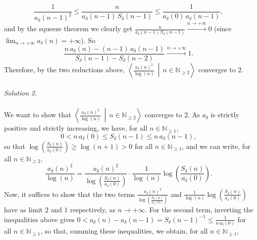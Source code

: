 \begin{solution}
    \[
        \frac{1}{a_\delta\left(n-1\right)^2} \leq \frac{n}{a_\delta\left(n-1\right)\,S_\delta\left(n-1\right)} \leq \frac{1}{a_\delta\left(0\right)\,a_\delta\left(n-1\right)},
    \]
    and by the squeeze theorem we clearly get \( \frac{n}{a_\delta\left(n-1\right)\,S_\delta\left(n-1\right)} \overset{n \to +\infty}{\longrightarrow} 0 \) (since \( \lim_{n \to +\infty} a_\delta\left(n\right) = +\infty \)). So
    \[
        \frac{n\,a_\delta\left(n\right)-\left(n-1\right)\,a_\delta\left(n-1\right)}{S_\delta\left(n-1\right)-S_\delta\left(n-2\right)} \overset{n \to +\infty}{\longrightarrow} 1.
    \]
    Therefore, by the two reductions above, \( \left\langle \frac{a_\delta\left(n\right)^2}{\log\left(n\right)} \,\middle|\, n \in \mathbb{N}_{\geq 2} \right\rangle \) converges to \( 2 \).
    \\\\
    \textit{Solution 2.}
    \\\\
    We want to show that \( \left\langle \frac{a_\delta\left(n\right)^2}{\log\left(n\right)} \,\middle|\, n \in \mathbb{N}_{\geq 2} \right\rangle \) converges to \( 2 \). As \( a_\delta \) is strictly positive and strictly increasing, we have, for all \( n \in \mathbb{N}_{\geq 1} \),
    \[
        0 < n\,a_\delta\left(0\right) \leq S_\delta\left(n-1\right) \leq n\,a_\delta\left(n-1\right),
    \]
    so that \( \log\left(\frac{S_\delta\left(n\right)}{a_\delta\left(0\right)}\right) \geq \log\left(n+1\right) > 0 \) for all \( n \in \mathbb{N}_{\geq 1} \), and we can write, for all \( n \in \mathbb{N}_{\geq 2} \),
    \[
        \frac{a_\delta\left(n\right)^2}{\log\left(n\right)} = \frac{a_\delta\left(n\right)^2}{\log\left(\frac{S_\delta\left(n\right)}{a_\delta\left(0\right)}\right)} \cdot \frac{1}{\log\left(n\right)}\log\left(\frac{S_\delta\left(n\right)}{a_\delta\left(0\right)}\right).
    \]
    Now, it suffices to show that the two terms \( \frac{a_\delta\left(n\right)^2}{\log\left(\frac{S_\delta\left(n\right)}{a_\delta\left(0\right)}\right)} \) and \( \frac{1}{\log\left(n\right)}\log\left(\frac{S_\delta\left(n\right)}{a_\delta\left(0\right)}\right) \) have as limit \( 2 \) and \( 1 \) respectively, as \( n \to +\infty \). For the second term, inverting the inequalities above gives \( 0 < a_\delta\left(n\right)-a_\delta\left(n-1\right) = S_\delta\left(n-1\right)^{-1} \leq \frac{1}{n\,a_\delta\left(0\right)} \) for all \( n \in \mathbb{N}_{\geq 1} \), so that, summing these inequalities, we obtain, for all \( n \in \mathbb{N}_{\geq 1} \),

\end{solution}
